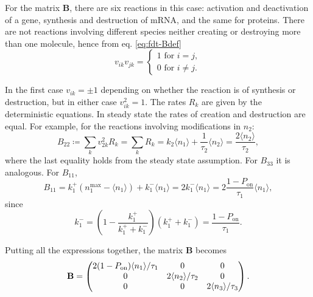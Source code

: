 For the matrix $\mathbf{B}$, there are six reactions in this case: activation and deactivation of a gene, synthesis and destruction of mRNA, and the same for proteins. There are not reactions involving different species neither creating or destroying more than one molecule, hence from eq. \eqref{eq:fdt-Bdef}
\begin{equation*}
  v_{ik}v_{jk} = 
  \begin{cases}
    1 \text{ for } i = j,\\
    0 \text{ for } i\neq j.
  \end{cases}
\end{equation*}

In the first case $v_{ik} =\pm 1$ depending on whether the reaction is of synthesis or destruction, but in either case $v_{ik}^2 = 1$. The rates $R_k$ are given by the deterministic equations. In steady state the rates of creation and destruction are equal. For example, for the reactions involving modifications in $n_2$:
\begin{equation*}
  B_{22} \coloneqq \sum_kv_{2k}^2R_k = \sum_kR_k = k_2\langle n_1\rangle + \frac{1}{\tau_2}\langle n_2\rangle = \frac{2\langle n_2\rangle}{\tau_2},
\end{equation*}
where the last equality holds from the steady state assumption. For $B_{33}$ it is analogous. For $B_{11}$,
\begin{equation*}
  B_{11} = k_1^+(n_1^\text{max}-\langle n_1\rangle)+k_1^-\langle n_1\rangle = 2k_1^-\langle n_1\rangle = 2\frac{1-P_\text{on}}{\tau_1}\langle n_1\rangle,
\end{equation*}
since
\begin{equation*}
  k_1^- = \left(1-\frac{k_1^+}{k_1^++k_1^-}\right)(k_1^++k_1^-)=\frac{1-P_\text{on}}{\tau_1}.
\end{equation*}

Putting all the expressions together, the matrix $\mathbf{B}$ becomes
\begin{equation}
  \label{eq:fdt-B}
  \mathbf{B} = 
  \begin{pmatrix}
    2(1-P_\text{on})\langle n_1\rangle/\tau_1 & 0 & 0 \\
    0 & 2\langle n_2\rangle/\tau_2 & 0 \\
    0 & 0 & 2\langle n_3\rangle/\tau_3
  \end{pmatrix}.\\
\end{equation}

